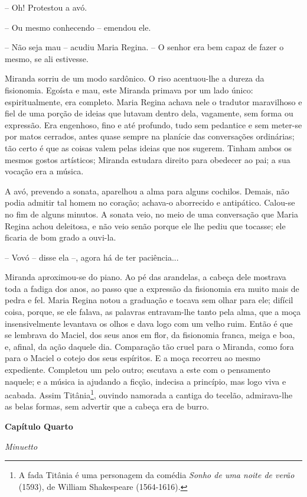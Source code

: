 -- Oh! Protestou a avó.

-- Ou mesmo conhecendo -- emendou ele.

-- Não seja mau -- acudiu Maria Regina. -- O senhor era bem capaz de
fazer o mesmo, se ali estivesse.

Miranda sorriu de um modo sardônico. O riso acentuou-lhe a dureza da
fisionomia. Egoísta e mau, este Miranda primava por um lado único:
espiritualmente, era completo. Maria Regina achava nele o tradutor
maravilhoso e fiel de uma porção de ideias que lutavam dentro dela,
vagamente, sem forma ou expressão. Era engenhoso, fino e até profundo,
tudo sem pedantice e sem meter-se por matos cerrados, antes quase sempre
na planície das conversações ordinárias; tão certo é que as coisas valem
pelas ideias que nos sugerem. Tinham ambos os mesmos gostos artísticos;
Miranda estudara direito para obedecer ao pai; a sua vocação era a
música.

A avó, prevendo a sonata, aparelhou a alma para alguns cochilos. Demais,
não podia admitir tal homem no coração; achava-o aborrecido e
antipático. Calou-se no fim de alguns minutos. A sonata veio, no meio de
uma conversação que Maria Regina achou deleitosa, e não veio senão
porque ele lhe pediu que tocasse; ele ficaria de bom grado a ouvi-la.

-- Vovó -- disse ela --, agora há de ter paciência...

Miranda aproximou-se do piano. Ao pé das arandelas, a cabeça dele
mostrava toda a fadiga dos anos, ao passo que a expressão da fisionomia
era muito mais de pedra e fel. Maria Regina notou a graduação e tocava
sem olhar para ele; difícil coisa, porque, se ele falava, as palavras
entravam-lhe tanto pela alma, que a moça insensivelmente levantava os
olhos e dava logo com um velho ruim. Então é que se lembrava do Maciel,
dos seus anos em flor, da fisionomia franca, meiga e boa, e, afinal, da
ação daquele dia. Comparação tão cruel para o Miranda, como fora para o
Maciel o cotejo dos seus espíritos. E a moça recorreu ao mesmo
expediente. Completou um pelo outro; escutava a este com o pensamento
naquele; e a música ia ajudando a ficção, indecisa a princípio, mas logo
viva e acabada. Assim Titânia\footnote{A fada Titânia é uma personagem
  da comédia \emph{Sonho de uma noite de verão} (1593), de William
  Shakespeare (1564-1616).}, ouvindo namorada a cantiga do tecelão,
admirava-lhe as belas formas, sem advertir que a cabeça era de burro.

\textbf{Capítulo Quarto}

\emph{Minuetto}

